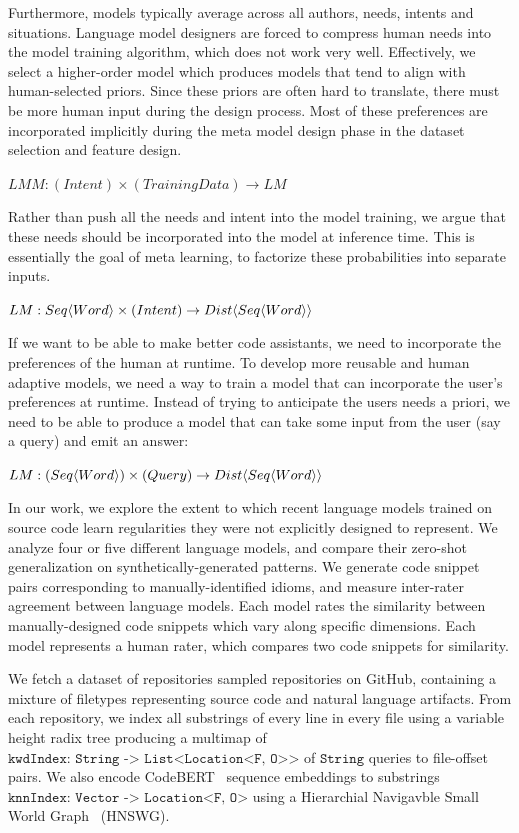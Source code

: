 \documentclass[sigconf]{acmart}
\begin{document}
  Furthermore, models typically average across all authors, needs, intents and situations. Language model designers are forced to compress human needs into the model training algorithm, which does not work very well. Effectively, we select a higher-order model which produces models that tend to align with human-selected priors. Since these priors are often hard to translate, there must be more human input during the design process. Most of these preferences are incorporated implicitly during the meta model design phase in the dataset selection and feature design.

  $LMM: (Intent) \times (Training Data) \rightarrow LM$

  Rather than push all the needs and intent into the model training, we argue that these needs should be incorporated into the model at inference time. This is essentially the goal of meta learning, to factorize these probabilities into separate inputs.

  $LM: Seq \langle Word \rangle \times (Intent) \rightarrow Dist\langle Seq \langle Word \rangle \rangle$

  If we want to be able to make better code assistants, we need to incorporate the preferences of the human at runtime. To develop more reusable and human adaptive models, we need a way to train a model that can incorporate the user’s preferences at runtime. Instead of trying to anticipate the users needs a priori, we need to be able to produce a model that can take some input from the user (say a query) and emit an answer:

  $LM: ( Seq \langle Word \rangle ) \times (Query) \rightarrow Dist\langle Seq \langle Word \rangle \rangle $



  In our work, we explore the extent to which recent language models trained on source code learn regularities they were not explicitly designed to represent. We analyze four or five different language models, and compare their zero-shot generalization on synthetically-generated patterns. We generate code snippet pairs corresponding to manually-identified idioms, and measure inter-rater agreement between language models. Each model rates the similarity between manually-designed code snippets which vary along specific dimensions. Each model represents a human rater, which compares two code snippets for similarity.

  We fetch a dataset of repositories sampled repositories on GitHub, containing a mixture of filetypes representing source code and natural language artifacts. From each repository, we index all substrings of every line in every file using a variable height radix tree producing a multimap of $\texttt{kwdIndex: String -> List<Location<F, O>>}$ of $\texttt{String}$  queries to file-offset pairs. We also encode CodeBERT~\citep{feng2020codebert} sequence embeddings to substrings $\texttt{knnIndex: Vector -> Location<F, O>}$ using a Hierarchial Navigavble Small World Graph~\citep{malkov2018efficient} (HNSWG).
\end{document}
